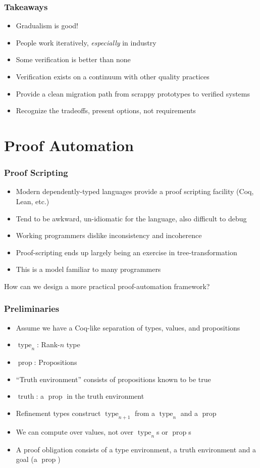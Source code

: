 \documentclass{beamer}
\newcommand{\typekw}[1]{\ensuremath{{\operatorname{type}}_{#1}}}
\newcommand{\propkw}{\ensuremath{\operatorname{prop}}}
\newcommand{\truthkw}{\ensuremath{\operatorname{truth}}}
\begin{document}
\begin{frame}
  \frametitle{Takeaways}
  \begin{itemize}
    \item Gradualism is good!
    \item People work iteratively, \emph{especially} in industry
    \item Some verification is better than none
    \item Verification exists on a continuum with other quality practices
    \item Provide a clean migration path from scrappy prototypes to
      verified systems
    \item Recognize the tradeoffs, present options, not requirements
  \end{itemize}
\end{frame}

\section{Proof Automation}

\begin{frame}
  \frametitle{Proof Scripting}
  \begin{itemize}
    \item Modern dependently-typed languages provide a proof scripting
      facility (Coq, Lean, etc.)
    \item Tend to be awkward, un-idiomatic for the language, also
      difficult to debug
    \item Working programmers dislike inconsistency and incoherence
    \item Proof-scripting ends up largely being an exercise in
      tree-transformation
    \item This is a model familiar to many programmers
  \end{itemize}
  How can we design a more practical proof-automation framework?
\end{frame}

\begin{frame}
  \frametitle{Preliminaries}
  \begin{itemize}
    \item Assume we have a Coq-like separation of types, values, and
      propositions
    \item \typekw{n}: Rank-$n$ type
    \item \propkw{}: Propositions
    \item ``Truth environment'' consists of propositions known to be true
    \item \truthkw{}: a \propkw{} in the truth environment
    \item Refinement types construct \typekw{n+1} from a \typekw{n}
      and a \propkw{}
    \item We can compute over values, not over \typekw{n}s or
      \propkw{}s
    \item A proof obligation consists of a type environment, a truth
      environment and a goal (a \propkw)
  \end{itemize}
\end{frame}
\end{document}
